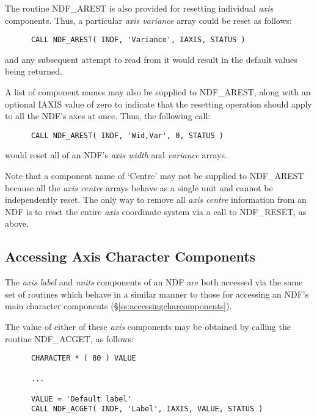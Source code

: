 \documentclass[twoside,11pt]{article}
\newcommand{\htmlref}[2]{#1}
\newcommand{\xlabel}[1]{}
\newcommand{\st}[1]{{\em{#1}}}
\begin{document}
The routine \htmlref{NDF\_AREST}{NDF_AREST} is also provided for resetting individual \st{axis\/} components. 
Thus, a particular \st{axis variance\/} array could be reset as follows: 

\small
\begin{verbatim}
      CALL NDF_AREST( INDF, 'Variance', IAXIS, STATUS )
\end{verbatim}
\normalsize

and any subsequent attempt to read from it would result in the default
values being returned. 

A list of component names may also be supplied to NDF\_AREST, along with an
optional IAXIS value of zero to indicate that the resetting operation should
apply to all the NDF's axes at once. 
Thus, the following call:

\small
\begin{verbatim}
      CALL NDF_AREST( INDF, 'Wid,Var', 0, STATUS )
\end{verbatim}
\normalsize

would reset all of an NDF's \st{axis width\/} and \st{variance\/} arrays.

Note that a component name of `Centre' may not be supplied to
NDF\_AREST because all the \st{axis centre\/} arrays behave as a single 
unit and cannot be independently reset.
The only way to remove all \st{axis centre\/} information from an NDF is to
reset the entire \st{axis\/} coordinate system via a call to NDF\_RESET, as 
above.

\subsection{\xlabel{accessing_axis_character_components}\label{ss:acmsg}Accessing Axis Character Components}

The \st{axis label\/} and \st{units\/} components of an NDF are both
accessed via the same set of routines which behave in a similar manner to
those for accessing an NDF's main character components 
(\S\ref{ss:accessingcharcomponents}). 

The value of either of these \st{axis\/} components may be obtained by
calling the routine \htmlref{NDF\_ACGET}{NDF_ACGET}, as follows: 

\small
\begin{verbatim}
      CHARACTER * ( 80 ) VALUE

      ...

      VALUE = 'Default label'
      CALL NDF_ACGET( INDF, 'Label', IAXIS, VALUE, STATUS )
\end{verbatim}
\normalsize
\end{document}

